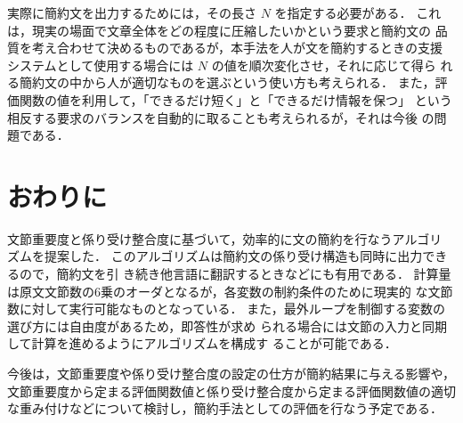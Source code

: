 実際に簡約文を出力するためには，その長さ $N$ を指定する必要がある．
これは，現実の場面で文章全体をどの程度に圧縮したいかという要求と簡約文の
品質を考え合わせて決めるものであるが，本手法を人が文を簡約するときの支援
システムとして使用する場合には $N$ の値を順次変化させ，それに応じて得ら
れる簡約文の中から人が適切なものを選ぶという使い方も考えられる．
また，評価関数の値を利用して，「できるだけ短く」と「できるだけ情報を保つ」
という相反する要求のバランスを自動的に取ることも考えられるが，それは今後
の問題である．

\section{おわりに}
 文節重要度と係り受け整合度に基づいて，効率的に文の簡約を行なうアルゴリ
ズムを提案した．
このアルゴリズムは簡約文の係り受け構造も同時に出力できるので，簡約文を引
き続き他言語に翻訳するときなどにも有用である．
計算量は原文文節数の6乗のオーダとなるが，各変数の制約条件のために現実的
な文節数に対して実行可能なものとなっている．
また，最外ループを制御する変数の選び方には自由度があるため，即答性が求め
られる場合には文節の入力と同期して計算を進めるようにアルゴリズムを構成す
ることが可能である．

 今後は，文節重要度や係り受け整合度の設定の仕方が簡約結果に与える影響や，
文節重要度から定まる評価関数値と係り受け整合度から定まる評価関数値の適切
な重み付けなどについて検討し，簡約手法としての評価を行なう予定である．







